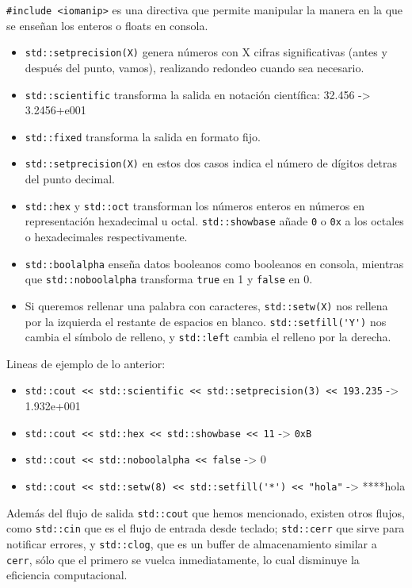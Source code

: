 \documentclass[a4paper]{article}
\begin{document}
	  \verb|#include <iomanip>| es una directiva que permite manipular la manera en la que se enseñan los enteros o floats en consola. 
	 
	 \begin{itemize}
	 	\item \verb|std::setprecision(X)| genera números con X cifras significativas (antes y después del punto, vamos), realizando redondeo cuando sea necesario.
	 	\item \verb|std::scientific| transforma la salida en notación científica: 32.456 -> 3.2456+e001
	 	\item \verb|std::fixed| transforma la salida en formato fijo.
	 	\item \verb|std::setprecision(X)| en estos dos casos indica el número de dígitos detras del punto decimal.
	 	\item \verb|std::hex| y \verb|std::oct| transforman los números enteros en números en representación hexadecimal u octal. \verb|std::showbase| añade \verb|0| o \verb|0x| a los octales o hexadecimales respectivamente.
	 	\item \verb|std::boolalpha| enseña datos booleanos como booleanos en consola, mientras que \verb|std::noboolalpha| transforma \verb|true| en 1 y \verb|false| en 0.
	 	
	 	\item Si queremos rellenar una palabra con caracteres, \verb|std::setw(X)| nos rellena por la izquierda el restante de espacios en blanco. \verb|std::setfill('Y')| nos cambia el símbolo de relleno, y \verb|std::left| cambia el relleno por la derecha.
	 \end{itemize}
	 
	 Lineas de ejemplo de lo anterior:
	 \begin{itemize}
	 	\item \verb|std::cout << std::scientific << std::setprecision(3) << 193.235| -> 1.932e+001
	 	\item \verb|std::cout << std::hex << std::showbase << 11| -> \verb|0xB|
	 	\item \verb|std::cout << std::noboolalpha << false| -> 0
	 	\item \verb|std::cout << std::setw(8) << std::setfill('*') << "hola"| -> ****hola
	 \end{itemize}
 
 	Además del flujo de salida \verb|std::cout| que hemos mencionado, existen otros flujos, como \verb|std::cin| que es el flujo de entrada desde teclado; \verb|std::cerr| que sirve para notificar errores, y \verb|std::clog|, que es un buffer de almacenamiento similar a \verb|cerr|, sólo que el primero se vuelca inmediatamente, lo cual disminuye la eficiencia computacional.
	 
\end{document}
